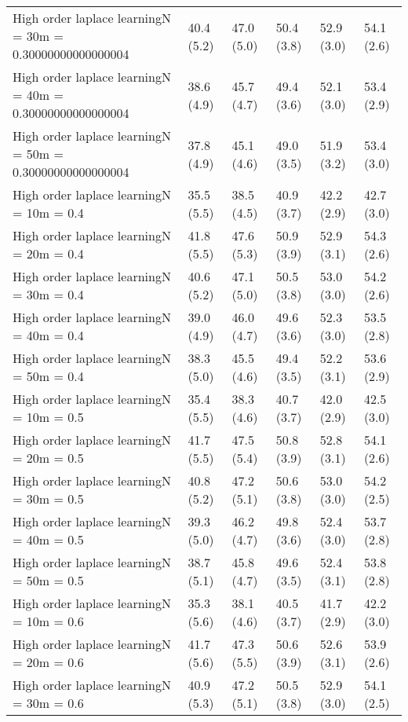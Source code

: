 \documentclass{article}
\begin{document}
\begin{table*}[t!]
\begin{center}
\begin{small}
\begin{sc}
\begin{tabular}{llllll}
High order laplace learningN = 30m = 0.30000000000000004&40.4 (5.2)      &47.0 (5.0)      &50.4 (3.8)      &52.9 (3.0)      &54.1 (2.6)      \\
High order laplace learningN = 40m = 0.30000000000000004&38.6 (4.9)      &45.7 (4.7)      &49.4 (3.6)      &52.1 (3.0)      &53.4 (2.9)      \\
High order laplace learningN = 50m = 0.30000000000000004&37.8 (4.9)      &45.1 (4.6)      &49.0 (3.5)      &51.9 (3.2)      &53.4 (3.0)      \\
High order laplace learningN = 10m = 0.4&35.5 (5.5)      &38.5 (4.5)      &40.9 (3.7)      &42.2 (2.9)      &42.7 (3.0)      \\
High order laplace learningN = 20m = 0.4&41.8 (5.5)      &47.6 (5.3)      &50.9 (3.9)      &52.9 (3.1)      &54.3 (2.6)      \\
High order laplace learningN = 30m = 0.4&40.6 (5.2)      &47.1 (5.0)      &50.5 (3.8)      &53.0 (3.0)      &54.2 (2.6)      \\
High order laplace learningN = 40m = 0.4&39.0 (4.9)      &46.0 (4.7)      &49.6 (3.6)      &52.3 (3.0)      &53.5 (2.8)      \\
High order laplace learningN = 50m = 0.4&38.3 (5.0)      &45.5 (4.6)      &49.4 (3.5)      &52.2 (3.1)      &53.6 (2.9)      \\
High order laplace learningN = 10m = 0.5&35.4 (5.5)      &38.3 (4.6)      &40.7 (3.7)      &42.0 (2.9)      &42.5 (3.0)      \\
High order laplace learningN = 20m = 0.5&41.7 (5.5)      &47.5 (5.4)      &50.8 (3.9)      &52.8 (3.1)      &54.1 (2.6)      \\
High order laplace learningN = 30m = 0.5&40.8 (5.2)      &47.2 (5.1)      &50.6 (3.8)      &53.0 (3.0)      &54.2 (2.5)      \\
High order laplace learningN = 40m = 0.5&39.3 (5.0)      &46.2 (4.7)      &49.8 (3.6)      &52.4 (3.0)      &53.7 (2.8)      \\
High order laplace learningN = 50m = 0.5&38.7 (5.1)      &45.8 (4.7)      &49.6 (3.5)      &52.4 (3.1)      &53.8 (2.8)      \\
High order laplace learningN = 10m = 0.6&35.3 (5.6)      &38.1 (4.6)      &40.5 (3.7)      &41.7 (2.9)      &42.2 (3.0)      \\
High order laplace learningN = 20m = 0.6&41.7 (5.6)      &47.3 (5.5)      &50.6 (3.9)      &52.6 (3.1)      &53.9 (2.6)      \\
High order laplace learningN = 30m = 0.6&40.9 (5.3)      &47.2 (5.1)      &50.5 (3.8)      &52.9 (3.0)      &54.1 (2.5)      \\

\end{tabular}
\end{sc}
\end{small}
\end{center}
\end{table*}
\end{document}
